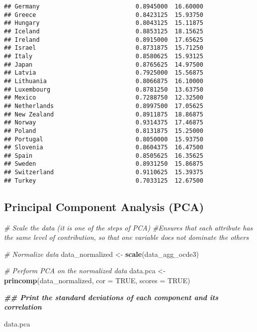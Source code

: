 \documentclass[
]{article}
\newenvironment{Shaded}{\begin{snugshade}}{\end{snugshade}}
\newcommand{\AttributeTok}[1]{\textcolor[rgb]{0.13,0.29,0.53}{#1}}
\newcommand{\CommentTok}[1]{\textcolor[rgb]{0.56,0.35,0.01}{\textit{#1}}}
\newcommand{\ConstantTok}[1]{\textcolor[rgb]{0.56,0.35,0.01}{#1}}
\newcommand{\DocumentationTok}[1]{\textcolor[rgb]{0.56,0.35,0.01}{\textbf{\textit{#1}}}}
\newcommand{\FunctionTok}[1]{\textcolor[rgb]{0.13,0.29,0.53}{\textbf{#1}}}
\newcommand{\NormalTok}[1]{#1}
\newcommand{\OtherTok}[1]{\textcolor[rgb]{0.56,0.35,0.01}{#1}}
\begin{document}
\begin{verbatim}
## Germany                           0.8945000  16.60000
## Greece                            0.8423125  15.93750
## Hungary                           0.8043125  15.11875
## Iceland                           0.8853125  18.15625
## Ireland                           0.8915000  17.65625
## Israel                            0.8731875  15.71250
## Italy                             0.8580625  15.93125
## Japan                             0.8765625  14.97500
## Latvia                            0.7925000  15.56875
## Lithuania                         0.8066875  16.10000
## Luxembourg                        0.8781250  13.63750
## Mexico                            0.7288750  12.32500
## Netherlands                       0.8997500  17.05625
## New Zealand                       0.8911875  18.86875
## Norway                            0.9314375  17.46875
## Poland                            0.8131875  15.25000
## Portugal                          0.8050000  15.93750
## Slovenia                          0.8604375  16.47500
## Spain                             0.8505625  16.35625
## Sweden                            0.8931250  15.86875
## Switzerland                       0.9110625  15.39375
## Turkey                            0.7033125  12.67500
\end{verbatim}

\subsection{\texorpdfstring{\textbf{Principal Component Analysis
(PCA)}}{Principal Component Analysis (PCA)}}\label{principal-component-analysis-pca}

\begin{Shaded}
\begin{Highlighting}[]
\CommentTok{\# Scale the data (it is one of the steps of PCA)}
\CommentTok{\#Ensures that each attribute has the same level of contribution, so that one variable does not dominate the others}

\CommentTok{\# Normalize data}
\NormalTok{data\_normalized }\OtherTok{\textless{}{-}} \FunctionTok{scale}\NormalTok{(data\_agg\_ocde3)}

\CommentTok{\# Perform PCA on the normalized data}
\NormalTok{data.pca }\OtherTok{\textless{}{-}} \FunctionTok{princomp}\NormalTok{(data\_normalized, }\AttributeTok{cor =} \ConstantTok{TRUE}\NormalTok{, }\AttributeTok{scores =} \ConstantTok{TRUE}\NormalTok{)}

\DocumentationTok{\#\# Print the standard deviations of each component and its correlation}

\NormalTok{data.pca}
\end{Highlighting}
\end{Shaded}
\end{document}
